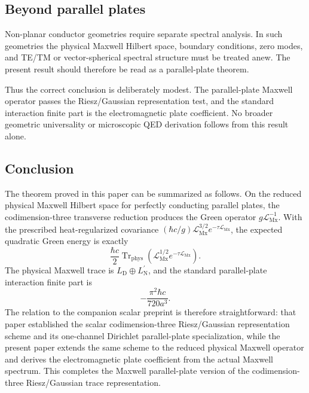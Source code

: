 \documentclass[11pt]{article}
\providecommand{\hbarc}{\hbar c}
\providecommand{\Trphys}{\operatorname{Tr}_{\mathrm{phys}}}
\providecommand{\paren}[1]{\left(#1\right)}
\providecommand{\LMx}{\mathcal L_{\mathrm{Mx}}}
\providecommand{\LD}{L_{\mathrm D}}
\providecommand{\LNp}{L_{\mathrm N}^{\prime}}
\numberwithin{equation}{section}
\begin{document}
\subsection{Beyond parallel plates}
\label{subsec:possible-next-tests}

Non-planar conductor geometries require separate spectral analysis.  In such
geometries the physical Maxwell Hilbert space, boundary conditions, zero modes,
and TE/TM or vector-spherical spectral structure must be treated anew.  The
present result should therefore be read as a parallel-plate theorem.

Thus the correct conclusion is deliberately modest.  The parallel-plate Maxwell
operator passes the Riesz/Gaussian representation test, and the standard
interaction finite part is the electromagnetic plate coefficient.  No broader
geometric universality or microscopic QED derivation follows from this result
alone.

\subsection{Conclusion}
\label{subsec:conclusion}

The theorem proved in this paper can be summarized as follows.  On the reduced
physical Maxwell Hilbert space for perfectly conducting parallel plates, the
codimension-three transverse reduction produces the Green operator
\(g\LMx^{-1}\).  With the prescribed heat-regularized covariance
\((\hbarc/g)\LMx^{3/2}e^{-\tau\LMx}\), the expected quadratic Green energy is
exactly
\[
    \frac{\hbarc}{2}
    \Trphys\paren{\LMx^{1/2}e^{-\tau\LMx}} .
\]
The physical Maxwell trace is \(\LD\oplus\LNp\), and the standard
parallel-plate interaction finite part is
\[
    -\frac{\pi^2\hbarc}{720a^3} .
\]
The relation to the companion scalar preprint \cite{KhanKhan2026Scalar} is
therefore straightforward: that paper established the scalar codimension-three
Riesz/Gaussian representation scheme and its one-channel Dirichlet
parallel-plate specialization, while the present paper extends the same scheme
to the reduced physical Maxwell operator and derives the electromagnetic plate
coefficient from the actual Maxwell spectrum.
This completes the Maxwell parallel-plate version of the codimension-three
Riesz/Gaussian trace representation.

\appendix
\end{document}
